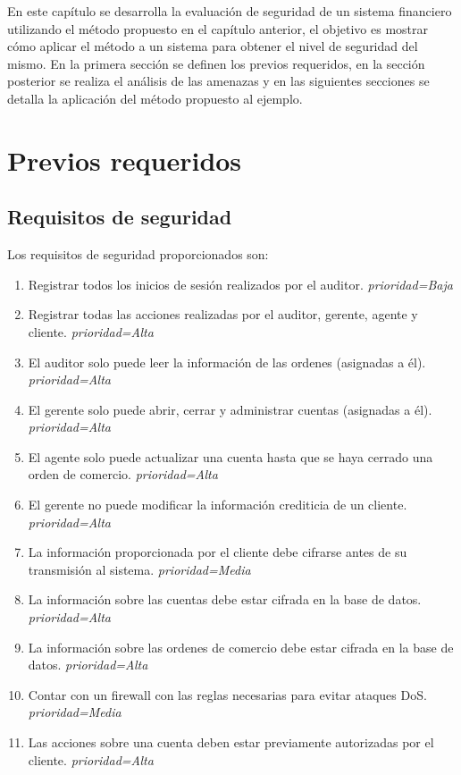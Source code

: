 En este capítulo se desarrolla la evaluación de seguridad de un sistema financiero utilizando el método propuesto en el capítulo anterior, el objetivo es mostrar cómo aplicar el método a un sistema para obtener el nivel de seguridad del mismo. En la primera sección se definen los previos requeridos, en la sección posterior se realiza el análisis de las amenazas y en las siguientes secciones se detalla la aplicación del método propuesto al ejemplo.

\section{Previos requeridos}

\subsection{Requisitos de seguridad}
Los requisitos de seguridad proporcionados son:

\begin{enumerate}[label=Req$_{\arabic*}$:,leftmargin=*,noitemsep]
	\item Registrar todos los inicios de sesión realizados por el auditor. \textit{prioridad=Baja}
	\item Registrar todas las acciones realizadas por el auditor, gerente, agente y cliente. \textit{prioridad=Alta}
	\item El auditor solo puede leer la información de las ordenes (asignadas a él). \textit{prioridad=Alta}
	\item El gerente solo puede abrir, cerrar y administrar cuentas (asignadas a él). \textit{prioridad=Alta}
	\item El agente solo puede actualizar una cuenta hasta que se haya cerrado una orden de comercio. \textit{prioridad=Alta}
	\item El gerente no puede modificar la información crediticia de un cliente. \textit{prioridad=Alta}
	\item La información proporcionada por el cliente debe cifrarse antes de su transmisión al sistema. \textit{prioridad=Media}
	\item La información sobre las cuentas debe estar cifrada en la base de datos. \textit{prioridad=Alta}
	\item La información sobre las ordenes de comercio debe estar cifrada en la base de datos. \textit{prioridad=Alta}
	\item Contar con un firewall con las reglas necesarias para evitar ataques DoS. \textit{prioridad=Media}
	\item Las acciones sobre una cuenta deben estar previamente autorizadas por el cliente. \textit{prioridad=Alta}
\end{enumerate}

